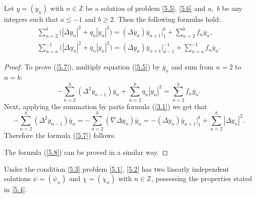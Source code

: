 \documentclass[pdftex]{sigma}
\numberwithin{equation}{section}
\begin{document}
\begin{lemma}
\label{Lem5.1}Let $y=(y_{n})$ with $n\in
\mathbb{Z}
$ be a solution of problem \eqref{5.5}, \eqref{5.6} and $a,$ $b$ be any
integers such that $a\leq -1$ and $b\geq 2$. Then the following formulas
hold:
\begin{gather}
\sum_{n=2}^{b}\big( \left\vert \Delta y_{n}\right\vert ^{2}+q_{n}\left\vert
y_{n}\right\vert ^{2}\big) =(\Delta y_{n})\overline{y}_{n+1}\big|
_{1}^{b}+\sum_{n=2}^{b}f_{n}\overline{y}_{n},  \label{5.7}
\\
\sum_{n=a}^{-1}\big( \left\vert \Delta y_{n}\right\vert
^{2}+q_{n}\left\vert y_{n}\right\vert ^{2}\big) =(\Delta y_{n})\overline{y}%
_{n+1}\big|_{a-1}^{-1}+\sum_{n=a}^{-1}f_{n}\overline{y}_{n}.  \label{5.8}
\end{gather}
\end{lemma}

\begin{proof}
To prove (\ref{5.7}), multiply equation (\ref{5.5}) by $\overline{y}_{n}$
and sum from $n=2$ to $n=b$:
\[
-\sum_{n=2}^{b}(\Delta ^{2}y_{n-1})\overline{y}_{n}+\sum_{n=2}^{b}q_{n}\left%
\vert y_{n}\right\vert ^{2}=\sum_{n=2}^{b}f_{n}\overline{y}_{n}.
\]%
Next, applying the summation by parts formula (\ref{3.1}) we get that%
\[
-\sum_{n=2}^{b}(\Delta ^{2}y_{n-1})\overline{y}_{n}=-\sum_{n=2}^{b}(\nabla
\Delta y_{n})\overline{y}_{n}=-(\Delta y_{n})\overline{y}_{n+1}\big|
_{1}^{b}+\sum_{n=2}^{b}\left\vert \Delta y_{n}\right\vert ^{2}.
\]%
Therefore the formula (\ref{5.7}) follows.

The formula (\ref{5.8}) can be proved in a similar way.
\end{proof}

\begin{theorem}
\label{Th5.2}Under the condition \eqref{5.3} problem \eqref{5.1}, \eqref{5.2} has two linearly independent solutions $\psi =(\psi _{n})$ and $\chi =(\chi
_{n})$ with $n\in
\mathbb{Z}
$, possessing the properties stated in \eqref{5.4}.
\end{theorem}
\end{document}
